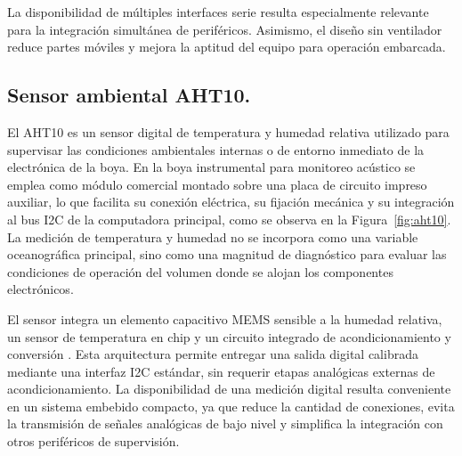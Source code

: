 La disponibilidad de múltiples interfaces serie resulta especialmente relevante para la integración simultánea de periféricos. Asimismo, el diseño sin ventilador reduce partes móviles y mejora la aptitud del equipo para operación embarcada.

\vspace{10px}
\subsection{Sensor ambiental AHT10.}

El AHT10 es un sensor digital de temperatura y humedad relativa utilizado para supervisar las condiciones ambientales internas o de entorno inmediato de la electrónica de la boya. En la boya instrumental para monitoreo acústico se emplea como módulo comercial montado sobre una placa de circuito impreso auxiliar, lo que facilita su conexión eléctrica, su fijación mecánica y su integración al bus I2C de la computadora principal, como se observa en la Figura~\ref{fig:aht10}. La medición de temperatura y humedad no se incorpora como una variable oceanográfica principal, sino como una magnitud de diagnóstico para evaluar las condiciones de operación del volumen donde se alojan los componentes electrónicos.

El sensor integra un elemento capacitivo MEMS sensible a la humedad relativa, un sensor de temperatura en chip y un circuito integrado de acondicionamiento y conversión \citep{AHT10Datasheet}. Esta arquitectura permite entregar una salida digital calibrada mediante una interfaz I2C estándar, sin requerir etapas analógicas externas de acondicionamiento. La disponibilidad de una medición digital resulta conveniente en un sistema embebido compacto, ya que reduce la cantidad de conexiones, evita la transmisión de señales analógicas de bajo nivel y simplifica la integración con otros periféricos de supervisión.


